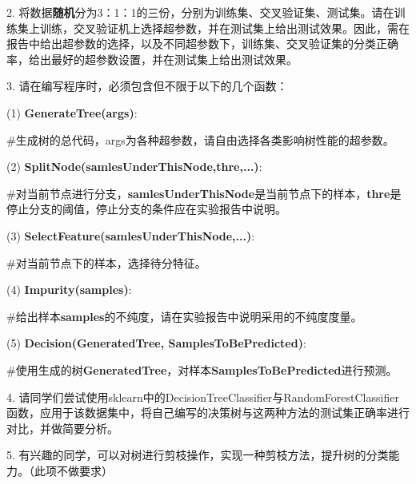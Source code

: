 \documentclass[UTF8]{ctexart}
\begin{document}
2. 将数据\textbf{随机}分为3：1：1的三份，分别为训练集、交叉验证集、测试集。请在训练集上训练，交叉验证机上选择超参数，并在测试集上给出测试效果。因此，需在报告中给出超参数的选择，以及不同超参数下，训练集、交叉验证集的分类正确率，给出最好的超参数设置，并在测试集上给出测试效果。

3. 请在编写程序时，必须包含但不限于以下的几个函数：

(1) \textbf{GenerateTree(args)}:

\#生成树的总代码，args为各种超参数，请自由选择各类影响树性能的超参数。

(2)  \textbf{SplitNode(samlesUnderThisNode,thre,...)}:

\#对当前节点进行分支，\textbf{samlesUnderThisNode}是当前节点下的样本，\textbf{thre}是停止分支的阈值，停止分支的条件应在实验报告中说明。

(3)  \textbf{SelectFeature(samlesUnderThisNode,...)}:

\#对当前节点下的样本，选择待分特征。

(4)  \textbf{Impurity(samples)}:

\#给出样本\textbf{samples}的不纯度，请在实验报告中说明采用的不纯度度量。

(5)  \textbf{Decision(GeneratedTree, SamplesToBePredicted)}:

\#使用生成的树\textbf{GeneratedTree}，对样本\textbf{SamplesToBePredicted}进行预测。

4. 请同学们尝试使用sklearn中的DecisionTreeClassifier与RandomForestClassifier函数，应用于该数据集中，将自己编写的决策树与这两种方法的测试集正确率进行对比，并做简要分析。

5. 有兴趣的同学，可以对树进行剪枝操作，实现一种剪枝方法，提升树的分类能力。（此项不做要求）
\end{document}
